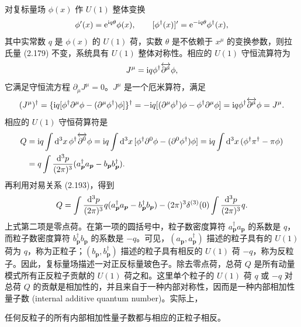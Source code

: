 对复标量场 $\phi(x)$ 作 $U(1)$ 整体变换
\begin{equation}
  \phi'(x)=\mathrm{e}^{\mathrm{i} q\theta}\phi(x),
  \qquad
  [\phi^\dagger(x)]'=\mathrm{e}^{-\mathrm{i} q\theta}\phi^\dagger(x),
\end{equation}
其中实常数 $q$ 是 $\phi(x)$ 的 $U(1)$ 荷，实数 $\theta$ 是不依赖于 $x^\mu$ 的变换参数，则拉氏量 (2.179) 不变，系统具有 $U(1)$ 整体对称性。相应的 $U(1)$ 守恒流算符为
\begin{equation}
  J^\mu=\mathrm{i} q\phi^\dagger\overleftrightarrow{\partial^\mu}\phi,
\end{equation}
它满足守恒流方程 $\partial_\mu J^\mu=0$。$J^\mu$ 是一个厄米算符，满足
\begin{equation}
  (J^\mu)^\dagger
  = \{\mathrm{i} q[\phi^\dagger\partial^\mu\phi-(\partial^\mu\phi^\dagger)\phi]\}^\dagger
  = -\mathrm{i} q[(\partial^\mu\phi^\dagger)\phi-\phi^\dagger\partial^\mu\phi]
  = \mathrm{i} q\phi^\dagger\overleftrightarrow{\partial^\mu}\phi
  = J^\mu.
\end{equation}
相应的 $U(1)$ 守恒荷算符是
\begin{align}
  Q
  &= \mathrm{i} q\int\dd^3x\,\phi^\dagger\overleftrightarrow{\partial^0}\phi
   = \mathrm{i} q\int\dd^3x\,[\phi^\dagger\partial^0\phi-(\partial^0\phi^\dagger)\phi]
   = \mathrm{i} q\int\dd^3x\,(\phi^\dagger\pi^\dagger-\pi\phi) \notag\\
  &= q\int\frac{\dd^3p}{(2\pi)^3}
     (a^\dagger_{\bm{p}}a_{\bm{p}}-b_{\bm{p}}b^\dagger_{\bm{p}}).
\end{align}
再利用对易关系 (2.193)，得到
\begin{equation}
  Q
  = \int\frac{\dd^3p}{(2\pi)^3}
    q(a^\dagger_{\bm{p}}a_{\bm{p}}-b^\dagger_{\bm{p}}b_{\bm{p}})
    -(2\pi)^3\delta^{(3)}(0)\int\frac{\dd^3p}{(2\pi)^3}q.
\end{equation}
上式第二项是零点荷。在第一项的圆括号中，粒子数密度算符 $a^\dagger_{\bm{p}}a_{\bm{p}}$ 的系数是 $q$，而粒子数密度算符 $b^\dagger_{\bm{p}}b_{\bm{p}}$ 的系数是 $-q$。可见，$(a_{\bm{p}},a^\dagger_{\bm{p}})$ 描述的粒子具有的 $U(1)$ 荷为 $q$，称为正粒子；$(b_{\bm{p}},b^\dagger_{\bm{p}})$ 描述的粒子具有相反的 $U(1)$ 荷 $-q$，称为反粒子。因此，复标量场描述一对正反标量玻色子。除去零点荷，总荷 $Q$ 是所有动量模式所有正反粒子贡献的 $U(1)$ 荷之和。这里单个粒子的 $U(1)$ 荷 $q$ 或 $-q$ 对总荷 $Q$ 的贡献是相加性的，并且来自于一种内部对称性，因而是一种内部相加性量子数 (internal additive quantum number)。实际上，

\begin{center}
  任何反粒子的所有内部相加性量子数都与相应的正粒子相反。
\end{center}

